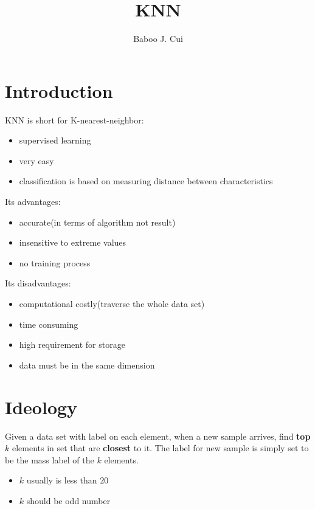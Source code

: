 \documentclass[10pt,a4paper,oneside]{article}
\author{Baboo J. Cui}
\begin{document}
\title{KNN}
\maketitle
\tableofcontents

\newpage
\section{Introduction}
KNN is short for K-nearest-neighbor:
\begin{itemize}
	\item supervised learning
	\item very easy
	\item classification is based on measuring distance between characteristics
\end{itemize}
Its advantages:
\begin{itemize}
	\item accurate(in terms of algorithm not result)
	\item insensitive to extreme values
	\item no training process
\end{itemize}
Its disadvantages:
\begin{itemize}
	\item computational costly(traverse the whole data set)
	\item time consuming
	\item high requirement for storage
	\item data must be in the same dimension
\end{itemize}

\section{Ideology}
Given a data set with label on each element, when a new sample arrives, find \textbf{top} $k$ elements in set that are \textbf{closest }to it. The label for new sample is simply set to be the mass label of the $k$ elements.
\begin{itemize}
	\item $k$ usually is less than $20$
	\item $k$ should be odd number
\end{itemize}
\end{document}
